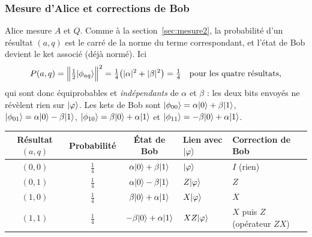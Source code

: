 \subsubsection{Mesure d'Alice et corrections de Bob}

Alice mesure $A$ et $Q$. Comme à la section~\ref{sec:mesure2}, la probabilité d'un résultat
$(a,q)$ est le carré de la norme du terme correspondant, et l'état de Bob devient le ket
associé (déjà normé). Ici
\[
  P(a,q)=\Big\|\tfrac12|\phi_{aq}\rangle\Big\|^2=\tfrac14\big(|\alpha|^2+|\beta|^2\big)=\tfrac14
  \quad\text{pour les quatre résultats,}
\]
qui sont donc équiprobables et \emph{indépendants} de $\alpha$ et $\beta$ : les deux bits
envoyés ne révèlent rien sur $|\varphi\rangle$. Les kets de Bob sont
$|\phi_{00}\rangle=\alpha|0\rangle+\beta|1\rangle$, $|\phi_{01}\rangle=\alpha|0\rangle-\beta|1\rangle$,
$|\phi_{10}\rangle=\beta|0\rangle+\alpha|1\rangle$ et $|\phi_{11}\rangle=-\beta|0\rangle+\alpha|1\rangle$.

\begin{center}
\renewcommand{\arraystretch}{1.5}
\begin{tabular}{@{}cccll@{}}
\toprule
Résultat $(a,q)$ & Probabilité & État de Bob & Lien avec $|\varphi\rangle$ & Correction de Bob \\
\midrule
$(0,0)$ & $\frac14$ & $\alpha|0\rangle+\beta|1\rangle$ & $|\varphi\rangle$ & $I$ (rien) \\
$(0,1)$ & $\frac14$ & $\alpha|0\rangle-\beta|1\rangle$ & $Z|\varphi\rangle$ & $Z$ \\
$(1,0)$ & $\frac14$ & $\beta|0\rangle+\alpha|1\rangle$ & $X|\varphi\rangle$ & $X$ \\
$(1,1)$ & $\frac14$ & $-\beta|0\rangle+\alpha|1\rangle$ & $XZ|\varphi\rangle$ & $X$ puis $Z$ (opérateur $ZX$) \\
\bottomrule
\end{tabular}
\end{center}

